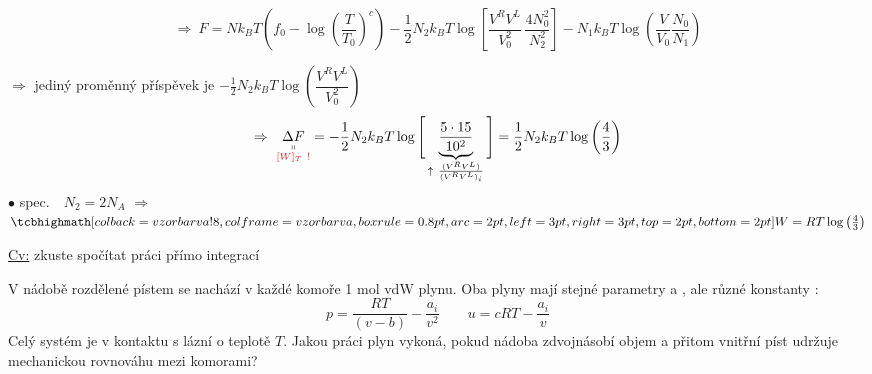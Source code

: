 \begin{tcolorbox}[colback=white,colframe=black,boxrule=0.5pt,sharp corners]
\[
  \Rightarrow\ F = Nk_BT\left(f_0 - \log\left(\frac{T}{T_0}\right)^c\right)
  - \frac12N_2k_BT\log\left[\frac{V^RV^L}{V_0^2}\,\frac{4N_0^2}{N_2^2}\right]
  - N_1k_BT\log\left(\frac{V}{V_0}\frac{N_0}{N_1}\right)
\]
\end{tcolorbox}

$\Rightarrow$ jediný proměnný příspěvek je \quad $-\frac12N_2k_BT\log\left(\dfrac{V^RV^L}{V_0^2}\right)$
\[
  \Rightarrow\ \underset{\substack{\shortparallel\\ \cervene{[W]_T\ !}}}{\Delta F}
  = -\frac12N_2k_BT\log\Bigg[\underbrace{\frac{5\cdot15}{10^2}}_{\uparrow\ \frac{(V^RV^L)}{(V^RV^L)_i}}\Bigg]
  = \frac12N_2k_BT\log\left(\frac43\right)
\]
$\bullet$ spec.\ \ $N_2 = 2N_A$ \quad $\Rightarrow$ \quad $\vzorec{W = RT\log\left(\tfrac43\right)}$

\underline{Cv:} zkuste spočítat práci přímo integrací

\begin{priklad}
V nádobě rozdělené pístem se nachází v každé komoře 1 mol vdW plynu. Oba plyny mají stejné parametry  a , ale různé konstanty :
\[
  p = \frac{RT}{(v - b)} - \frac{a_i}{v^2} \qquad u = cRT - \frac{a_i}{v}
\]
Celý systém je v kontaktu s lázní o teplotě $T$. Jakou práci plyn vykoná, pokud nádoba zdvojnásobí objem a přitom vnitřní píst udržuje mechanickou rovnováhu mezi komorami?
\end{priklad}

